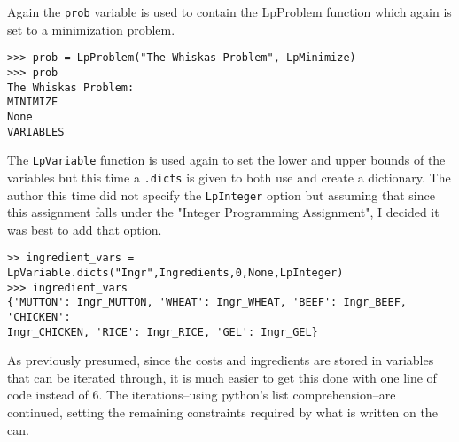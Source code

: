 \documentclass[10pt]{article}
\begin{document}
Again the \verb|prob| variable is used to contain the LpProblem function which again is set to a minimization problem.
\begin{verbatim}
>>> prob = LpProblem("The Whiskas Problem", LpMinimize)
>>> prob
The Whiskas Problem:
MINIMIZE
None
VARIABLES
\end{verbatim}
The \verb|LpVariable| function is used again to set the lower and upper bounds of the variables but this time a \verb|.dicts| is given to both use and create a dictionary. The author this time did not specify the \verb|LpInteger| option but assuming that since this assignment falls under the "Integer Programming Assignment", I decided it was best to add that option.
\begin{verbatim}
>> ingredient_vars = LpVariable.dicts("Ingr",Ingredients,0,None,LpInteger)
>>> ingredient_vars
{'MUTTON': Ingr_MUTTON, 'WHEAT': Ingr_WHEAT, 'BEEF': Ingr_BEEF, 'CHICKEN': 
Ingr_CHICKEN, 'RICE': Ingr_RICE, 'GEL': Ingr_GEL}
\end{verbatim}
As previously presumed, since the costs and ingredients are stored in variables that can be iterated through, it is much easier to get this done with one line of code instead of 6. The iterations--using python's list comprehension--are continued, setting the remaining constraints required by what is written on the can.
\end{document}
